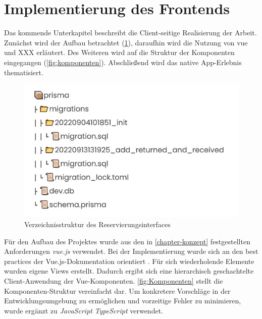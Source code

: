 
\section{Implementierung des Frontends}  Das kommende Unterkapitel beschreibt die Client-seitige
  Realisierung der Arbeit. Zunächst wird der Aufbau betrachtet (\ref{fig:vue}), daraufhin wird die
  Nutzung von vue und XXX erläutert. Des Weiteren wird auf die Struktur der Komponenten eingegangen
  (\ref{fig:komponenten}). Abschließend wird das native App-Erlebnis thematisiert.

\begin{figure}[h]
  \centering
  \includegraphics[scale=0.7]{Bilder/Db.jpg}
  \caption[Verzeichnisstruktur des Reservierungsinterfaces]{Verzeichnisstruktur des Reservierungsinterfaces}
  \label{fig:vue}
\end{figure}

Für den Aufbau des Projektes wurde aus den in \ref{chapter-konzept} festgestellten Anforderungen
\textit{vue.js} verwendet. Bei der Implementierung wurde sich an den best practices der
Vue.js-Dokumentation orientiert . Für sich wiederholende Elemente wurden
eigene Views erstellt. Dadurch ergibt sich eine hierarchisch geschachtelte Client-Anwendung der
Vue-Komponenten. \ref{fig:Komponenten} stellt die Komponenten-Struktur vereinfacht dar. Um
konkretere Vorschläge in der Entwicklungsumgebung zu ermöglichen und vorzeitige Fehler zu
minimieren, wurde ergänzt zu \textit{JavaScript} \textit{TypeScript} verwendet.

